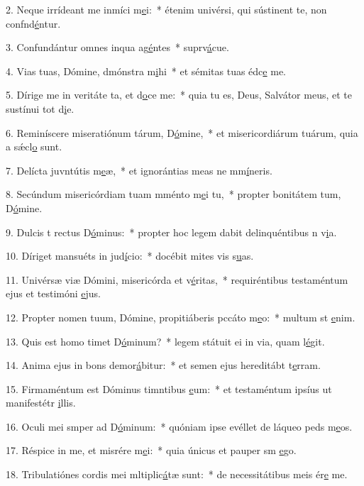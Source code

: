 2. Neque irrídeant me inmíci m\uline{e}i:~* étenim univérsi, qui sústinent te, non confnd\uline{é}ntur.\par 
3. Confundántur omnes inqua ag\uline{é}ntes~* suprv\uline{á}cue.\par 
4. Vias tuas, Dómine, dmónstra m\uline{i}hi~* et sémitas tuas édc\uline{e} me.\par 
5. Dírige me in veritáte ta, et d\uline{o}ce me:~* quia tu es, Deus, Salvátor meus, et te sustínui tot d\uline{i}e.\par 
6. Reminíscere miseratiónum tárum, D\uline{ó}mine,~* et misericordiárum tuárum, quia a sǽcl\uline{o} sunt.\par 
7. Delícta juvntútis m\uline{e}æ,~* et ignorántias meas ne mm\uline{í}neris.\par 
8. Secúndum misericórdiam tuam mménto m\uline{e}i tu,~* propter bonitátem tum, D\uline{ó}mine.\par 
9. Dulcis t rectus D\uline{ó}minus:~* propter hoc legem dabit delinquéntibus n v\uline{i}a.\par 
10. Díriget mansuéts in jud\uline{í}cio:~* docébit mites vis s\uline{u}as.\par 
11. Univérsæ viæ Dómini, misericórda et v\uline{é}ritas,~* requiréntibus testaméntum ejus et testimóni \uline{e}jus.\par 
12. Propter nomen tuum, Dómine, propitiáberis pccáto m\uline{e}o:~* multum st \uline{e}nim.\par 
13. Quis est homo  timet D\uline{ó}minum?~* legem státuit ei in via, quam l\uline{é}git.\par 
14. Anima ejus in bons demor\uline{á}bitur:~* et semen ejus hereditábt t\uline{e}rram.\par 
15. Firmaméntum est Dóminus timntibus \uline{e}um:~* et testaméntum ipsíus ut manifestétr \uline{i}llis.\par 
16. Oculi mei smper ad D\uline{ó}minum:~* quóniam ipse evéllet de láqueo peds m\uline{e}os.\par 
17. Réspice in me, et misrére m\uline{e}i:~* quia únicus et pauper sm \uline{e}go.\par 
18. Tribulatiónes cordis mei mltiplic\uline{á}tæ sunt:~* de necessitátibus meis ér\uline{e} me.\par 
